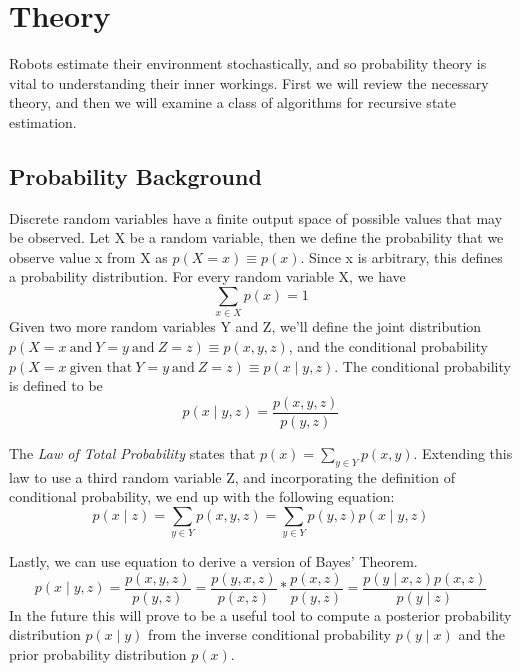 \chapter{Theory}

Robots estimate their environment stochastically, and so probability theory is vital to understanding their inner workings. First we will review the necessary theory, and then we will examine a class of algorithms for recursive state estimation.

\section{Probability Background}
Discrete random variables have a finite output space of possible values that may be observed. Let X be a random variable, then we define the probability that we observe value x from X as \( p(X = x) \equiv p(x)\). Since x is arbitrary, this defines a probability distribution. For every random variable X, we have
\begin{equation*}
\sum\limits_{x \in X} p(x) = 1
\end{equation*}
Given two more random variables Y and Z, we'll define the joint distribution \(p(X=x\ \textrm{and}\ Y=y\ \textrm{and}\ Z=z) \equiv p(x,y,z)\), and the conditional probability \(p(X=x\ \textrm{given that}\ Y=y\ \textrm{and}\ Z=z) \equiv p(x \mathbin{\vert} y,z)\). The conditional probability is defined to be
\begin{equation} \label{eqCondProb}
p(x \mathbin{\vert} y,z) = \frac{p(x,y,z)}{p(y,z)}
\end{equation}

The \textit{Law of Total Probability} states that \(p(x) = \sum\limits_{y \in Y} p(x,y)\). Extending this law to use a third random variable Z, and incorporating the definition of conditional probability, we end up with the following equation:
\begin{equation} \label{eqTotalProb}
p(x \mathbin{\vert} z) = \sum\limits_{y \in Y} p(x,y,z)
= \sum\limits_{y \in Y} p(y,z)p(x \mathbin{\vert} y,z)
\end{equation}

Lastly, we can use equation  to derive a version of Bayes' Theorem. 
\begin{equation} \label{eqBayesThm}
p(x \mathbin{\vert} y,z) = \frac{p(x,y,z)}{p(y,z)} = \frac{p(y,x,z)}{p(x,z)} * \frac{p(x,z)}{p(y,z)} = \frac{p(y \mathbin{\vert} x,z)p(x,z)}{p(y \mathbin{\vert} z)}
\end{equation}
In the future this will prove to be a useful tool to compute a posterior probability distribution \(p(x \mathbin{\vert} y)\) from the inverse conditional probability \(p(y \mathbin{\vert} x)\) and the prior probability distribution \(p(x)\).

